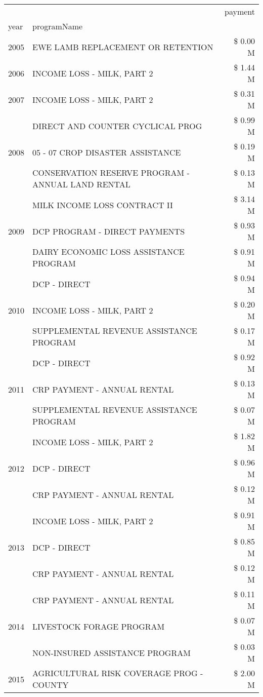 \begin{tabular}{llr}
\toprule
 &  & payment \\
year & programName &  \\
\midrule
2005 & EWE LAMB REPLACEMENT OR RETENTION & \$ 0.00 M \\
\cline{1-3}
2006 & INCOME LOSS - MILK, PART 2 & \$ 1.44 M \\
\cline{1-3}
2007 & INCOME LOSS - MILK, PART 2 & \$ 0.31 M \\
\cline{1-3}
\multirow[t]{3}{*}{2008} & DIRECT AND COUNTER CYCLICAL PROG & \$ 0.99 M \\
 & 05 - 07 CROP DISASTER ASSISTANCE & \$ 0.19 M \\
 & CONSERVATION RESERVE PROGRAM - ANNUAL LAND RENTAL & \$ 0.13 M \\
\cline{1-3}
\multirow[t]{3}{*}{2009} & MILK INCOME LOSS CONTRACT II & \$ 3.14 M \\
 & DCP PROGRAM - DIRECT PAYMENTS & \$ 0.93 M \\
 & DAIRY ECONOMIC LOSS ASSISTANCE PROGRAM & \$ 0.91 M \\
\cline{1-3}
\multirow[t]{3}{*}{2010} & DCP - DIRECT & \$ 0.94 M \\
 & INCOME LOSS - MILK, PART 2 & \$ 0.20 M \\
 & SUPPLEMENTAL REVENUE ASSISTANCE PROGRAM & \$ 0.17 M \\
\cline{1-3}
\multirow[t]{3}{*}{2011} & DCP - DIRECT & \$ 0.92 M \\
 & CRP PAYMENT - ANNUAL RENTAL & \$ 0.13 M \\
 & SUPPLEMENTAL REVENUE ASSISTANCE PROGRAM & \$ 0.07 M \\
\cline{1-3}
\multirow[t]{3}{*}{2012} & INCOME LOSS - MILK, PART 2 & \$ 1.82 M \\
 & DCP - DIRECT & \$ 0.96 M \\
 & CRP PAYMENT - ANNUAL RENTAL & \$ 0.12 M \\
\cline{1-3}
\multirow[t]{3}{*}{2013} & INCOME LOSS - MILK, PART 2 & \$ 0.91 M \\
 & DCP - DIRECT & \$ 0.85 M \\
 & CRP PAYMENT - ANNUAL RENTAL & \$ 0.12 M \\
\cline{1-3}
\multirow[t]{3}{*}{2014} & CRP PAYMENT - ANNUAL RENTAL & \$ 0.11 M \\
 & LIVESTOCK FORAGE PROGRAM & \$ 0.07 M \\
 & NON-INSURED ASSISTANCE PROGRAM & \$ 0.03 M \\
\cline{1-3}
\multirow[t]{3}{*}{2015} & AGRICULTURAL RISK COVERAGE PROG - COUNTY & \$ 2.00 M \\

\end{tabular}
